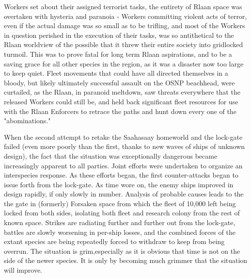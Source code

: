 Workers set about their assigned terrorist tasks, the entirety of
Rlaan space was overtaken with hysteria and paranoia - Workers
committing violent acts of terror, even if the actual damage was so
small as to be trifling, and most of the Workers in question perished
in the execution of their tasks, was so antithetical to the Rlaan
worldview of the possible that it threw their entire society into
gridlocked turmoil. This was to prove fatal for long term Rlaan
aspirations, and to be a saving grace for all other species in the
region, as it was a disaster now too large to keep quiet. Fleet
movements that could have all directed themselves in a bloody, but
likely ultimately successful assault on the OSNP beachhead, were
curtailed, as the Rlaan, in paranoid meltdown, saw threats everywhere
that the released Workers could still be, and held back significant
fleet resources for use with the Rlaan Enforcers to retrace the paths
and hunt down every one of the "abominations."

When the second attempt to retake the Saahasaay homeworld and the
lock-gate failed (even more poorly than the first, thanks to new waves
of ships of unknown design), the fact that the situation was
exceptionally dangerous became increasingly apparent to all
parties. Joint efforts were undertaken to organize an interspecies
response. As these efforts began, the first counter-attacks began to
issue forth from the lock-gate. As time wore on, the enemy ships
improved in design rapidly, if only slowly in number. Analysis of
probable causes leads to the the gate in (formerly) Forsaken space
from which the fleet of 10,000 left being locked from both sides,
isolating both fleet and research colony from the rest of known
space. Strikes are radiating further and further out from the
lock-gate, battles are slowly worsening in per-ship losses, and the
combined forces of the extant species are being repeatedly forced to
withdraw to keep from being overrun. The situation is grim,especially
as it is obvious that time is not on the side of the newer species. It
is only by becoming much grimmer that the situation will improve.

